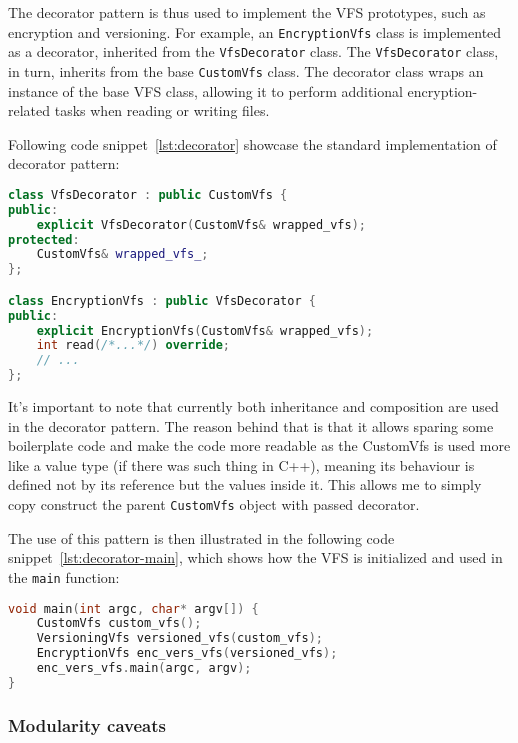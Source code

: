 The decorator pattern is thus used to implement the VFS prototypes, such as encryption and versioning.
For example, an \texttt{EncryptionVfs} class is implemented as a decorator, inherited from the \texttt{VfsDecorator} class.
The \texttt{VfsDecorator} class, in turn, inherits from the base \texttt{CustomVfs} class.
The decorator class wraps an instance of the base VFS class, allowing it to perform additional encryption-related tasks when reading or writing files.

Following code snippet~\ref{lst:decorator} showcase the standard implementation of decorator pattern:

\begin{lstlisting}[language=c++, caption={Decorator pattern implementation},label={lst:decorator},basicstyle=\ttfamily\small]
class VfsDecorator : public CustomVfs {
public:
    explicit VfsDecorator(CustomVfs& wrapped_vfs);
protected:
    CustomVfs& wrapped_vfs_;
};

class EncryptionVfs : public VfsDecorator {
public:
    explicit EncryptionVfs(CustomVfs& wrapped_vfs);
    int read(/*...*/) override;
    // ...
};
\end{lstlisting}

It's important to note that currently both inheritance and composition are used in the decorator pattern.
The reason behind that is that it allows sparing some boilerplate code and make the code more readable as the CustomVfs is used more like a value type (if there was such thing in C++), meaning its behaviour is defined not by its reference but the values inside it.
This allows me to simply copy construct the parent \texttt{CustomVfs} object with passed decorator.

The use of this pattern is then illustrated in the following code snippet~\ref{lst:decorator-main}, which shows how the VFS is initialized and used in the \texttt{main} function:

\begin{lstlisting}[language=c++, caption={VFS initialization and usage},label={lst:decorator-main}, basicstyle=\ttfamily\small]
void main(int argc, char* argv[]) {
    CustomVfs custom_vfs();
    VersioningVfs versioned_vfs(custom_vfs);
    EncryptionVfs enc_vers_vfs(versioned_vfs);
    enc_vers_vfs.main(argc, argv);
}
\end{lstlisting}

\subsubsection{Modularity caveats}\label{subsubsec:modularity-cavs}


